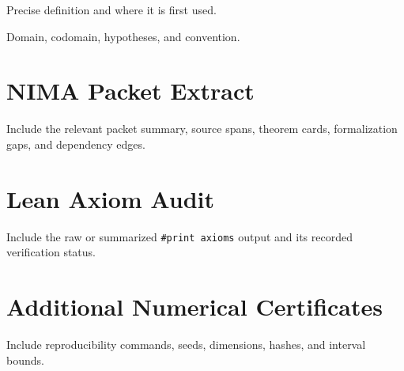 \documentclass[11pt]{article}
\begin{document}
\begin{description}[leftmargin=2.5cm,style=nextline]
\item[Example shorthand] Precise definition and where it is first used.
\item[Example symbol] Domain, codomain, hypotheses, and convention.
\end{description}

\section{NIMA Packet Extract}
Include the relevant packet summary, source spans, theorem cards, formalization
gaps, and dependency edges.

\section{Lean Axiom Audit}
Include the raw or summarized \texttt{\#print axioms} output and its
recorded verification status.

\section{Additional Numerical Certificates}
Include reproducibility commands, seeds, dimensions, hashes, and interval
bounds.
\end{document}
